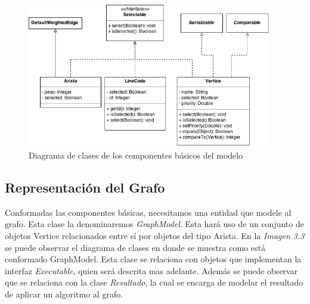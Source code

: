 \documentclass{book}
\begin{document}
\begin{figure}[H]
	\centering
	\includegraphics[width=0.95\textwidth]{images/01-01.png}
	\medskip
	\caption{Diagrama de clases de los componentes básicos del modelo}
	\medskip
\end{figure}
\medskip



\subsection{Representación del Grafo}

Conformadas las componentes básicas, necesitamos una entidad que modele al grafo. Esta clase la denominaremos \textit{GraphModel}. Esta hará uso de un conjunto de objetos Vertice relacionados entre sí por objetos del tipo Arista. En la \textit{Imagen 3.3} se puede observar el diagrama de clases en donde se muestra como está conformado GraphModel. Esta clase se relaciona con objetos que implementan la interfaz \textit{Executable}, quien será descrita mas adelante. Además se puede observar que se relaciona con la clase \textit{Resultado}, la cual se encarga de modelar el resultado de aplicar un algoritmo al grafo.
\bigskip\bigskip 
\end{document}

